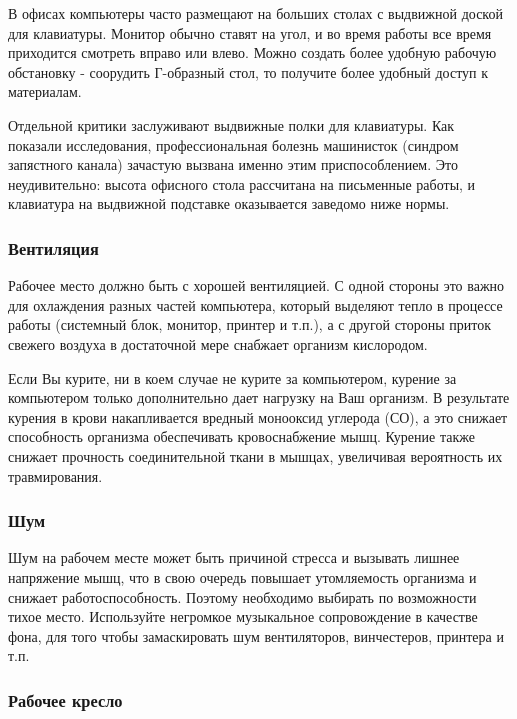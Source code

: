 \documentclass[russian,utf8,emptystyle]{eskdtext}
\begin{document}
\begin{spacing}{1.5}
В офисах компьютеры часто размещают на больших столах с выдвижной доской для клавиатуры. Монитор обычно ставят на угол, и во время работы все время приходится смотреть вправо или влево. Можно создать более удобную рабочую обстановку - соорудить Г-образный стол, то получите более удобный доступ к материалам. 

Отдельной критики заслуживают выдвижные полки для клавиатуры. Как показали исследования, профессиональная болезнь машинисток (синдром запястного канала) зачастую вызвана именно этим приспособлением. Это неудивительно: высота офисного стола рассчитана на письменные работы, и клавиатура на выдвижной подставке оказывается заведомо ниже нормы.
\subsubsection{Вентиляция}

Рабочее место должно быть с хорошей вентиляцией. С одной стороны это важно для охлаждения разных частей компьютера, который выделяют тепло в процессе работы (системный блок, монитор, принтер и т.п.), а с другой стороны приток свежего воздуха в достаточной мере снабжает организм кислородом.

Если Вы курите, ни в коем случае не курите за компьютером, курение за компьютером только дополнительно дает нагрузку на Ваш организм. В результате курения в крови накапливается вредный монооксид углерода (СО), а это снижает способность организма обеспечивать кровоснабжение мышц. Курение также снижает прочность соединительной ткани в мышцах, увеличивая вероятность их травмирования.

\subsubsection{Шум}

Шум на рабочем месте может быть причиной стресса и вызывать лишнее напряжение мышц, что в свою очередь повышает утомляемость организма и снижает работоспособность. Поэтому необходимо выбирать по возможности тихое место. Используйте негромкое музыкальное сопровождение в качестве фона, для того чтобы замаскировать шум вентиляторов, винчестеров, принтера и т.п. 

\subsubsection{Рабочее кресло}


\end{spacing}
\end{document}
